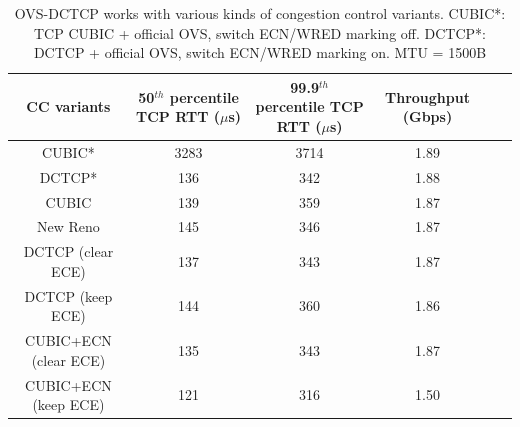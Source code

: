 \begin{table}[!htb]
\begin{center}
\begin{tabular}{ |c|c|c|c|c|c| }
 \hline
 CC variants & 50$^{th}$ percentile TCP RTT ($\mu$s) & 99.9$^{th}$ percentile TCP RTT ($\mu$s) & Throughput (Gbps) \\
 \hline
 CUBIC*  & 3283 & 3714 & 1.89 \\
 DCTCP*  & 136  & 342  & 1.88 \\
 \hline
 \hline

 CUBIC & 139 & 359 & 1.87 \\
 New Reno  & 145 & 346 & 1.87 \\
 DCTCP (clear ECE) & 137 & 343 & 1.87 \\
 DCTCP (keep ECE) &  144 & 360 &  1.86 \\
 CUBIC+ECN (clear ECE) & 135 & 343 & 1.87\\
 CUBIC+ECN (keep ECE) &  121 & 316 & 1.50 \\
 \hline
\end{tabular}
\caption{OVS-DCTCP works with various kinds of congestion control variants.
        CUBIC*: TCP CUBIC + official OVS, switch ECN/WRED marking off.
        DCTCP*: DCTCP + official OVS, switch ECN/WRED marking on. MTU = 1500B}
\label{other_cc_variants_1500}
\end{center}
\end{table}


